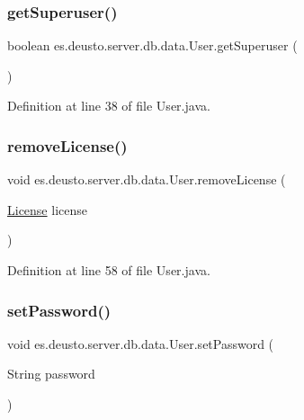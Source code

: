 \subsubsection{\texorpdfstring{get\+Superuser()}{getSuperuser()}}
{\footnotesize\ttfamily boolean es.\+deusto.\+server.\+db.\+data.\+User.\+get\+Superuser (\begin{DoxyParamCaption}{ }\end{DoxyParamCaption})}



Definition at line 38 of file User.\+java.

\mbox{\label{classes_1_1deusto_1_1server_1_1db_1_1data_1_1_user_a5ee17c4a3ab4eceb028a087f96527375}} 
\subsubsection{\texorpdfstring{remove\+License()}{removeLicense()}}
{\footnotesize\ttfamily void es.\+deusto.\+server.\+db.\+data.\+User.\+remove\+License (\begin{DoxyParamCaption}\item[{\hyperlink{classes_1_1deusto_1_1server_1_1db_1_1data_1_1_license}{License}}]{license }\end{DoxyParamCaption})}



Definition at line 58 of file User.\+java.

\mbox{\label{classes_1_1deusto_1_1server_1_1db_1_1data_1_1_user_a0098f77da63338c8374ea1e5baab28c9}} 
\subsubsection{\texorpdfstring{set\+Password()}{setPassword()}}
{\footnotesize\ttfamily void es.\+deusto.\+server.\+db.\+data.\+User.\+set\+Password (\begin{DoxyParamCaption}\item[{String}]{password }\end{DoxyParamCaption})}



